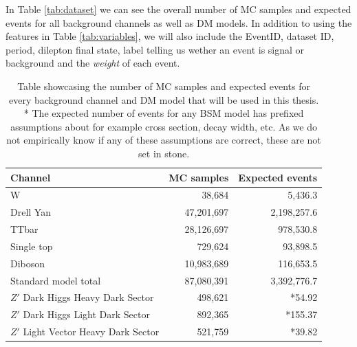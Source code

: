 \documentclass[12pt, a4paper]{book}
\begin{document}
In Table \ref{tab:dataset} we can see the overall number of MC samples and expected events for all background channels as well as DM models. In addition to using the features in Table \ref{tab:variables}, we will also include the EventID, dataset ID, period, 
dilepton final state, label telling us wether an event is signal or background and the \textit{weight} of each event.
\begin{table}[!h]
   \centering
    \caption[Dataset used for ML]{Table showcasing the number of MC samples and expected events for every background channel and DM model that will be used in this thesis.\\ * The expected number of events for any BSM model has prefixed assumptions about for example 
      cross section, decay width, etc. As we do not empirically know if any of these assumptions are correct, these are not set in stone.}
   \begin{tabular}{l|r|r}\midrule\midrule
      Channel                                                                         & MC samples            & Expected events  \\\midrule
      W                                                                               & 38,684                & 5,436.3        \\
      Drell Yan                                                                       & 47,201,697            & 2,198,257.6    \\
      TTbar                                                                           & 28,126,697            & 978,530.8      \\
      Single top                                                                      & 729,624               & 93,898.5       \\
      Diboson                                                                         & 10,983,689            & 116,653.5      \\\midrule
      Standard model total                                                            & 87,080,391            & 3,392,776.7    \\\midrule
      $Z'$ Dark Higgs Heavy Dark Sector                                               & 498,621               & *54.92         \\
      $Z'$ Dark Higgs Light Dark Sector                                               & 892,365               & *155.37         \\
      $Z'$ Light Vector Heavy Dark Sector                                             & 521,759               & *39.82         \\

\end{tabular}
\end{table}
\end{document}
